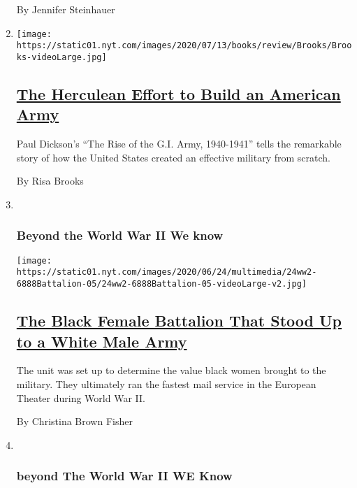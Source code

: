 \begin{enumerate}
  By Jennifer Steinhauer
\item
  \texttt{[image: https://static01.nyt.com/images/2020/07/13/books/review/Brooks/Brooks-videoLarge.jpg]}

  \hypertarget{the-herculean-effort-to-build-an-american-army}{%
  \subsection{\texorpdfstring{\href{/2020/07/15/books/review/the-rise-of-the-gi-army-paul-dickson.html}{The
  Herculean Effort to Build an American
  Army}}{The Herculean Effort to Build an American Army}}\label{the-herculean-effort-to-build-an-american-army}}

  Paul Dickson's ``The Rise of the G.I. Army, 1940-1941'' tells the
  remarkable story of how the United States created an effective
  military from scratch.

  By Risa Brooks
\item ~
  \hypertarget{beyond-the-world-war-ii-we-know-5}{%
  \subsubsection{Beyond the World War II We
  know}\label{beyond-the-world-war-ii-we-know-5}}

  \texttt{[image: https://static01.nyt.com/images/2020/06/24/multimedia/24ww2-6888Battalion-05/24ww2-6888Battalion-05-videoLarge-v2.jpg]}

  \hypertarget{the-black-female-battalion-that-stood-up-to-a-white-male-army}{%
  \subsection{\texorpdfstring{\href{/2020/06/17/magazine/6888th-battalion-charity-adams.html}{The
  Black Female Battalion That Stood Up to a White Male
  Army}}{The Black Female Battalion That Stood Up to a White Male Army}}\label{the-black-female-battalion-that-stood-up-to-a-white-male-army}}

  The unit was set up to determine the value black women brought to the
  military. They ultimately ran the fastest mail service in the European
  Theater during World War II.

  By Christina Brown Fisher
\item ~
  \hypertarget{beyond-the-world-war-ii-we-know-6}{%
  \subsubsection{beyond The World War II WE
  Know}\label{beyond-the-world-war-ii-we-know-6}}


\end{enumerate}
